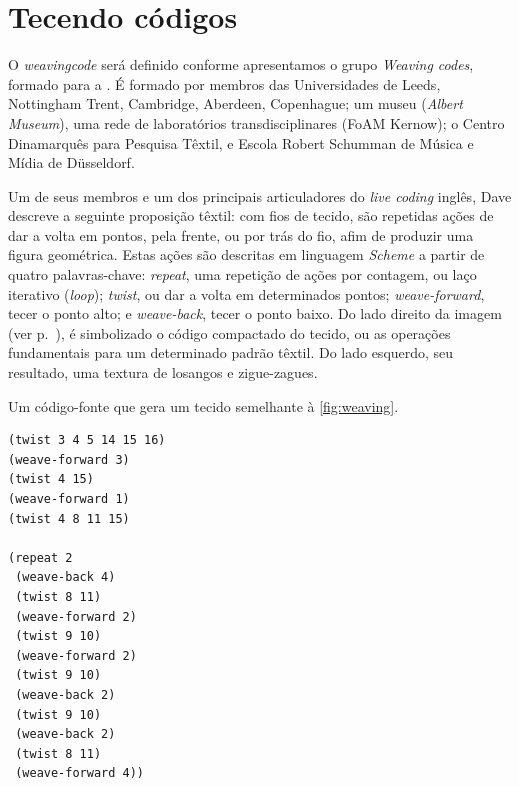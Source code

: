 \section{Tecendo códigos}\label{sec:weave}

O \emph{weavingcode} será definido conforme apresentamos o grupo \emph{Weaving codes}, formado para  a . É formado por membros das Universidades de Leeds, Nottingham Trent, Cambridge, Aberdeen, Copenhague; um museu (\emph{Albert Museum}), uma rede de laboratórios transdisciplinares (FoAM Kernow); o Centro Dinamarquês para Pesquisa Têxtil, e Escola Robert Schumman de Música e Mídia de  Düsseldorf.

Um de seus membros e um dos principais articuladores do \emph{live coding} inglês, Dave  descreve a seguinte proposição têxtil: com fios de tecido, são repetidas ações de dar a volta em pontos, pela frente, ou por trás do fio, afim de produzir uma figura geométrica. Estas ações são descritas em linguagem \emph{Scheme} a partir de quatro palavras-chave: \emph{repeat}, uma repetição de ações por contagem, ou laço iterativo (\emph{loop}); \emph{twist}, ou dar a volta em determinados pontos; \emph{weave-forward}, tecer o ponto alto; e \emph{weave-back}, tecer o ponto baixo. Do lado direito da imagem (ver p.~\pageref{fig:weaving}), é simbolizado o código compactado do tecido, ou as operações fundamentais para um determinado padrão têxtil. Do lado esquerdo, seu resultado, uma textura de losangos e zigue-zagues.  

\begin{example}{Um código-fonte que gera um tecido semelhante à \autoref{fig:weaving}.}
\label{ex:weaving}

\begin{verbatim}
(twist 3 4 5 14 15 16)
(weave-forward 3)
(twist 4 15)
(weave-forward 1)
(twist 4 8 11 15)

(repeat 2
 (weave-back 4)
 (twist 8 11)
 (weave-forward 2)
 (twist 9 10)
 (weave-forward 2)
 (twist 9 10)
 (weave-back 2)
 (twist 9 10)
 (weave-back 2)
 (twist 8 11)
 (weave-forward 4))
\end{verbatim}
\end{example}

